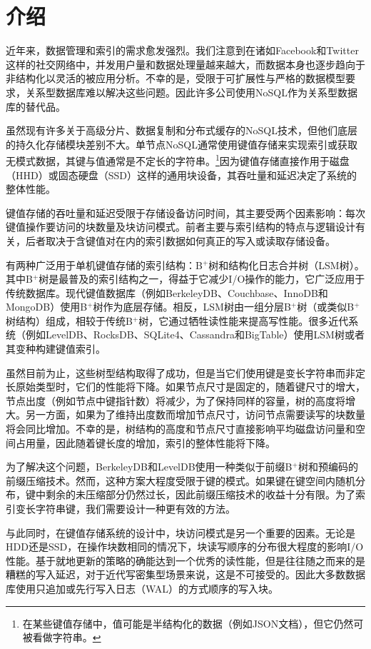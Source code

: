 \section{介绍}

近年来，数据管理和索引的需求愈发强烈。我们注意到在诸如Facebook和Twitter这样的社交网络中，并发用户量和数据处理量越来越大，而数据本身也逐步趋向于非结构化以灵活的被应用分析。不幸的是，受限于可扩展性与严格的数据模型要求，关系型数据库难以解决这些问题。因此许多公司使用NoSQL作为关系型数据库的替代品。

虽然现有许多关于高级分片、数据复制和分布式缓存的NoSQL技术，但他们底层的持久化存储模块差别不大。单节点NoSQL通常使用键值存储来实现索引或获取无模式数据，其键与值通常是不定长的字符串。\footnote{在某些键值存储中，值可能是半结构化的数据（例如JSON文档），但它仍然可被看做字符串。}因为键值存储直接作用于磁盘（HHD）或固态硬盘（SSD）这样的通用块设备，其吞吐量和延迟决定了系统的整体性能。

键值存储的吞吐量和延迟受限于存储设备访问时间，其主要受两个因素影响：每次键值操作要访问的块数量及块访问模式。前者主要与索引结构的特点与逻辑设计有关，后者取决于含键值对在内的索引数据如何真正的写入或读取存储设备。

有两种广泛用于单机键值存储的索引结构：B$^+$树和结构化日志合并树（LSM树）。其中B$^+$树是最普及的索引结构之一，得益于它减少I/O操作的能力，它广泛应用于传统数据库。现代键值数据库（例如BerkeleyDB、Couchbase、InnoDB和MongoDB）使用B$^+$树作为底层存储。相反，LSM树由一组分层B$^+$树（或类似B$^+$树结构）组成，相较于传统B$^+$树，它通过牺牲读性能来提高写性能。很多近代系统（例如LevelDB、RocksDB、SQLite4、Cassandra和BigTable）使用LSM树或者其变种构建键值索引。

虽然目前为止，这些树型结构取得了成功，但是当它们使用键是变长字符串而非定长原始类型时，它们的性能将下降。如果节点尺寸是固定的，随着键尺寸的增大，节点出度（例如节点中键指针数）将减少，为了保持同样的容量，树的高度将增大。另一方面，如果为了维持出度数而增加节点尺寸，访问节点需要读写的块数量将会同比增加。不幸的是，树结构的高度和节点尺寸直接影响平均磁盘访问量和空间占用量，因此随着键长度的增加，索引的整体性能将下降。

为了解决这个问题，BerkeleyDB和LevelDB使用一种类似于前缀B$^+$树和预编码的前缀压缩技术。然而，这种方案大程度受限于键的模式。如果键在键空间内随机分布，键中剩余的未压缩部分仍然过长，因此前缀压缩技术的收益十分有限。为了索引变长字符串键，我们需要设计一种更有效的方法。

与此同时，在键值存储系统的设计中，块访问模式是另一个重要的因素。无论是HDD还是SSD，在操作块数相同的情况下，块读写顺序的分布很大程度的影响I/O性能。基于就地更新的策略的确能达到一个优秀的读性能，但是往往随之而来的是糟糕的写入延迟，对于近代写密集型场景来说，这是不可接受的。因此大多数数据库使用只追加或先行写入日志（WAL）的方式顺序的写入块。


